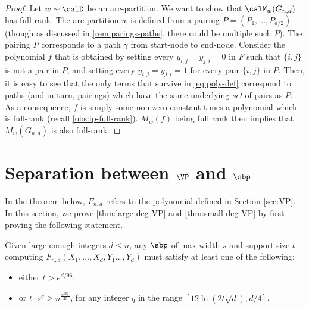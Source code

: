 \documentclass{article}
\begin{document}
\begin{proof}
    Let $w\sim \calD$ be an arc-partition. 
    We want to show that $\calM_w(G_{n,d})$ has full rank. 
    The arc-partition $w$ is defined from a pairing $P = (P_1,\ldots,P_{d/2})$ (though as discussed in \autoref{rem:parings-paths}, there could be multiple such $P$). 
    The pairing $P$ corresponds to a path $\gamma$ from start-node to end-node. 
    Consider the polynomial $f$ that is obtained by setting every $y_{i,j} = y_{j,i} = 0$ in $F$ such that $\{i,j\}$ is not a pair in $P$, and setting every $y_{i,j} = y_{j,i} = 1$ for every pair $\{i,j\}$ in $P$. 
    Then, it is easy to see that the only terms that survive in \autoref{eq:poly-def} correspond to paths (and in turn, pairings) which have the same underlying \emph{set} of pairs as $P$.
    As a consequence, $f$ is simply some non-zero constant times a polynomial which is full-rank (recall \autoref{obs:ip-full-rank}).
    $M_w(f)$ being full rank then implies that $M_w(G_{n,d})$ is also full-rank.
\end{proof}

\section{Separation between $\VP$ and $\sbp$}

In the theorem below, $F_{n,d}$ refers to the polynomial defined in Section \ref{sec:VP}. 
In this section, we prove \autoref{thm:large-deg-VP} and \autoref{thm:small-deg-VP} by first proving the following statement. 

\begin{lem}\label{lem:VP}
    Given large enough integers $d\leq n$, any $\sbp$ of max-width $s$ and support size $t$ computing $F_{n,d}(X_1,\ldots,X_d,Y_1\ldots,Y_d)$ must satisfy at least one of the following:
    \begin{itemize}
        \item either $t>e^{d/96}$,
        \item or $t\cdot s^q \geq n^{\frac{\sqrt{dq}}{20}}$, for any integer $q$ in the range $ [12\ln(2t\sqrt{d}), d/4]$.
    \end{itemize}  
\end{lem}
\end{document}

